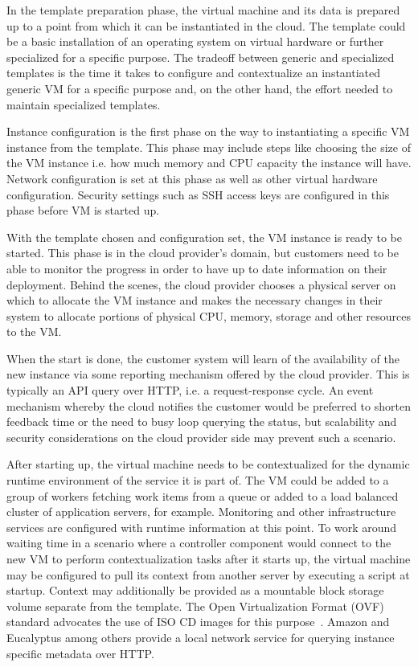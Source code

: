 \documentclass[english]{tktltiki2}
\theoremstyle{definition}
\theoremstyle{remark}
\begin{document}
In the template preparation phase, the virtual machine and its data is prepared
up to a point from which it can be instantiated in the cloud. The template could
be a basic installation of an operating system on virtual hardware or further
specialized for a specific purpose. The tradeoff between generic and specialized
templates is the time it takes to configure and contextualize an instantiated
generic VM for a specific purpose and, on the other hand, the effort needed to
maintain specialized templates.

Instance configuration is the first phase on the way to instantiating a specific
VM instance from the template. This phase may include steps like choosing the
size of the VM instance i.e. how much memory and CPU capacity the instance will
have. Network configuration is set at this phase as well as other virtual
hardware configuration. Security settings such as SSH access keys are configured
in this phase before VM is started up.

With the template chosen and configuration set, the VM instance is ready to be
started. This phase is in the cloud provider’s domain, but customers need to be
able to monitor the progress in order to have up to date information on their
deployment. Behind the scenes, the cloud provider chooses a physical server on
which to allocate the VM instance and makes the necessary changes in their
system to allocate portions of physical CPU, memory, storage and other resources
to the VM.

When the start is done, the customer system will learn of the availability of
the new instance via some reporting mechanism offered by the cloud provider.
This is typically an API query over HTTP, i.e. a request-response cycle. An
event mechanism whereby the cloud notifies the customer would be preferred to
shorten feedback time or the need to busy loop querying the status, but
scalability and security considerations on the cloud provider side may prevent
such a scenario.

After starting up, the virtual machine needs to be contextualized for the
dynamic runtime environment of the service it is part of. The VM could be added
to a group of workers fetching work items from a queue or added to a load
balanced cluster of application servers, for example. Monitoring and other
infrastructure services are configured with runtime information at this point.
To work around waiting time in a scenario where a controller component would
connect to the new VM to perform contextualization tasks after it starts up, the
virtual machine may be configured to pull its context from another server by
executing a script at startup. Context may additionally be provided as a
mountable block storage volume separate from the template. The Open
Virtualization Format (OVF) standard advocates the use of ISO CD images for this
purpose~\cite{ovf11}. Amazon and Eucalyptus among others provide a local network
service for querying instance specific metadata over HTTP.
\end{document}
